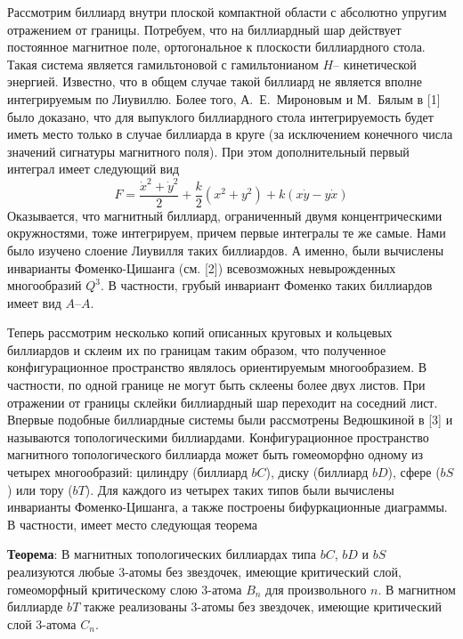 



\vzmscaption

Рассмотрим биллиард внутри плоской компактной области с абсолютно упругим отражением от границы. Потребуем, что на биллиардный шар действует постоянное магнитное поле, ортогональное к плоскости биллиардного стола. Такая система является гамильтоновой с гамильтонианом $H$-- кинетической энергией. Известно, что в общем случае такой биллиард не является вполне интегрируемым по Лиувиллю. Более того, А.~Е.~Мироновым и М.~Бялым в [1] было доказано, что для выпуклого биллиардного стола интегрируемость будет иметь место только в случае биллиарда в круге (за исключением конечного числа значений сигнатуры магнитного поля). При этом дополнительный первый интеграл имеет следующий вид
$$F=\frac{\dot{x}^2+\dot{y}^2}{2}+\frac{k}{2}(x^2+y^2)+k(x\dot{y}-y\dot{x})$$
Оказывается, что магнитный биллиард, ограниченный двумя концентрическими окружностями, тоже интегрируем, причем первые интегралы те же самые. Нами было изучено слоение Лиувилля таких биллиардов. А именно, были вычислены инварианты Фоменко-Цишанга (см. [2]) всевозможных невырожденных многообразий $Q^3$. В частности, грубый инвариант Фоменко таких биллиардов имеет вид $A$--$A$.

Теперь рассмотрим несколько копий описанных круговых и кольцевых биллиардов и склеим их по границам таким образом, что полученное конфигурационное пространство являлось ориентируемым многообразием. В частности, по одной границе не могут быть склеены более двух листов. При отражении от границы склейки биллиардный шар переходит на соседний лист. Впервые подобные биллиардные системы были рассмотрены Ведюшкиной в [3] и называются топологическими биллиардами. Конфигурационное пространство магнитного топологического биллиарда может быть гомеоморфно одному из четырех многообразий: цилиндру (биллиард $bC$), диску (биллиард $bD$), сфере ($bS$) или тору ($bT$). Для каждого из четырех таких типов были вычислены инварианты Фоменко-Цишанга, а также построены бифуркационные диаграммы. В частности, имеет место следующая теорема

\textbf{Теорема}: В магнитных топологических биллиардах типа $bC$, $bD$ и $bS$ реализуются любые 3-атомы без звездочек, имеющие критический слой, гомеоморфный критическому слою 3-атома $B_n$ для произвольного $n$. В магнитном биллиарде $bT$ также реализованы 3-атомы без звездочек, имеющие критический слой 3-атома $C_n$.


